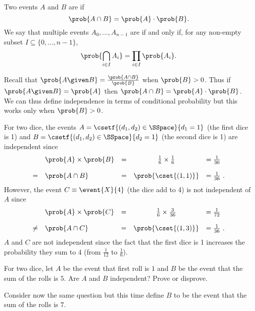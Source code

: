 \begin{definition}[Independence]
Two events $A$ and $B$ are    if 
\[
\prob{A \cap B} = \prob{A} \cdot \prob{B}.
\]  
%
We say that multiple events $A_0, \dots, A_{n-1}$  are  if and only if, for any non-empty subset $I \subseteq \{0, \dots, n-1\}$,
\[
\prob{\bigcap_{i \in I} A_i} = \prod_{i\in I} \prob{A_i}.
\]
\end{definition}

\begin{flex}
\begin{gram}
Recall that  $\prob{A \given B} = \frac{\prob{A \cap
    B}}{\prob{B}}$ when $\prob{B} > 0$. Thus if $\prob{A \given B} = \prob{A}$ then
 $\prob{A \cap B} = \prob{A} \cdot \prob{B}$.
%
We can thus define independence in terms of conditional probability
but this works only when $\prob{B} > 0$. 
\end{gram}

\begin{example}
For two dice, the events $A = \csetf{(d_1,d_2) \in
  \SSpace}{d_1=1}$ (the first dice is 1) and $B = \csetf{(d_1,d_2) \in
  \SSpace}{d_2=1}$ (the second dice is 1) are independent since
%
\[
\begin{array}{llccl}\
& \prob{A} \times \prob{B} & = & \frac{1}{6} \times \frac{1}{6} & = \frac{1}{36} \\[4mm]
= & \prob{A \cap B} & = & \prob{\cset{(1,1)}} & = \frac{1}{36}~.
\end{array}
\]
%
However, the event $C \equiv \event{X}{4}$ (the dice add to 4) is not independent of $A$
since 
\[
\begin{array}{llccl}
& \prob{A} \times \prob{C} & = &\frac{1}{6} \times \frac{3}{36} & = \frac{1}{72} \\[4mm]
\neq & \prob{A \cap C} & = & \prob{\cset{(1,3)}} & = \frac{1}{36}~.
\end{array}
\]
$A$ and $C$ are not
independent since the fact that the first dice is 1 increases the
probability they sum to $4$ (from $\frac{1}{12}$ to $\frac{1}{6}$).

\end{example}
\end{flex}

\begin{exercise}
For two dice, let $A$ be the event that first roll is $1$ and $B$ be
the event that the sum of the rolls is $5$.
Are $A$ and $B$ independent?  Prove or disprove.

Consider now the same question but this time define $B$ to be the
event that the sum of the rolls is $7$.  
\end{exercise}


